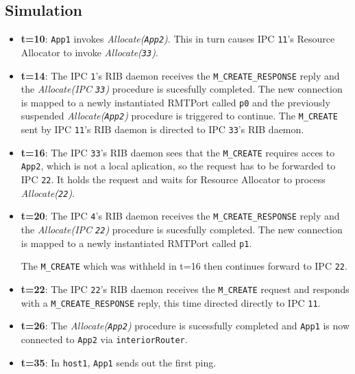         \subsection{Simulation}

            \begin{itemize}
            \item \textbf{t=10}: \texttt{App1} invokes \emph{Allocate(\texttt{App2})}. This in turn causes IPC \texttt{11}'s Resource Allocator to invoke \emph{Allocate(\texttt{33})}.

            \item \textbf{t=14}: The IPC \texttt{1}'s RIB daemon receives the \texttt{M\_CREATE\_RESPONSE} reply and the \emph{Allocate(IPC \texttt{33})} procedure is sucesfully completed. The new connection is mapped to a newly instantiated RMTPort called \texttt{p0} and the previously suspended \emph{Allocate(\texttt{App2})} procedure is triggered to continue. The \texttt{M\_CREATE} sent by IPC \texttt{11}'s RIB daemon is directed to IPC \texttt{33}'s RIB daemon.

            \item \textbf{t=16}: The IPC \texttt{33}'s RIB daemon sees that the \texttt{M\_CREATE} requires acces to \texttt{App2}, which is not a local aplication, so the request has to be forwarded to IPC \texttt{22}. It holds the request and waits for Resource Allocator to process \emph{Allocate(\texttt{22})}.

            \item \textbf{t=20}: The IPC \texttt{4}'s RIB daemon receives the \texttt{M\_CREATE\_RESPONSE} reply and the \emph{Allocate(IPC \texttt{22})} procedure is sucesfully completed. The new connection is mapped to a newly instantiated RMTPort called \texttt{p1}.

            The \texttt{M\_CREATE} which was withheld in t=16 then continues forward to IPC \texttt{22}.

            \item \textbf{t=22}: The IPC \texttt{22}'s RIB daemon receives the \texttt{M\_CREATE} request and responds with a \texttt{M\_CREATE\_RESPONSE} reply, this time directed directly to IPC \texttt{11}.

            \item \textbf{t=26}: The \emph{Allocate(\texttt{App2})} procedure is sucessfully completed and \texttt{App1} is now connected to \texttt{App2} via \texttt{interiorRouter}.

            \item \textbf{t=35}: In \texttt{host1}, \texttt{App1} sends out the first ping.


\end{itemize}
